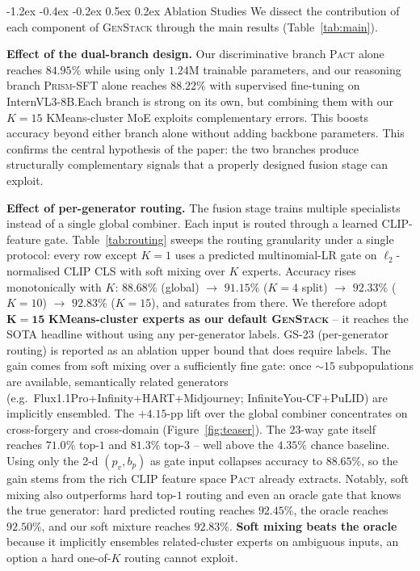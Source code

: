 \documentclass[10pt,twocolumn,letterpaper]{article}
\makeatletter
\renewcommand\subsection{\@startsection{subsection}{2}{\z@}%
  {-1.2ex \@plus -0.4ex \@minus -0.2ex}%
  {0.5ex \@plus 0.2ex}%
  {\normalfont\normalsize\bfseries}}
\newcommand{\vfive}{\textsc{Pact}}
\newcommand{\prism}{\textsc{Prism-SFT}}
\makeatother
\begin{document}
\subsection{Ablation Studies}
\label{sec:results}
We dissect the contribution of each component of \textsc{GenStack} through the main results (Table~\ref{tab:main}).

\textbf{Effect of the dual-branch design.}
Our discriminative branch \vfive{} alone reaches $84.95\%$ while using only $1.24$M trainable parameters, and our reasoning branch \prism{} alone reaches $88.22\%$ with supervised fine-tuning on InternVL3-8B.{Each branch is strong on its own, but combining them with our $K{=}15$ KMeans-cluster MoE exploits complementary errors. This boosts accuracy beyond either branch alone without adding backbone parameters.} This confirms the central hypothesis of the paper: the two branches produce structurally complementary signals that a properly designed fusion stage can exploit.

\textbf{Effect of per-generator routing.}
\label{sec:routing_ablation}
The fusion stage trains multiple specialists instead of a single global combiner. Each input is routed through a learned CLIP-feature gate. Table~\ref{tab:routing} sweeps the routing granularity under a single protocol: every row except $K{=}1$ uses a predicted multinomial-LR gate on $\ell_2$-normalised CLIP CLS with soft mixing over $K$ experts. Accuracy rises monotonically with $K$: $88.68\%$ (global) $\to$ $91.15\%$ ($K{=}4$ split) $\to$ $92.33\%$ ($K{=}10$) $\to$ $\mathbf{92.83\%}$ ($K{=}15$), and saturates from there. We therefore adopt $\mathbf{K{=}15}$ \textbf{KMeans-cluster experts as our default \textsc{GenStack}} -- it reaches the SOTA headline without using any per-generator labels. \textsc{GS-23} (per-generator routing) is reported as an ablation upper bound that does require labels. The gain comes from soft mixing over a sufficiently fine gate: once $\sim\!15$ subpopulations are available, semantically related generators (e.g.\ Flux1.1Pro+Infinity+HART+Midjourney; InfiniteYou-CF+PuLID) are implicitly ensembled. The $+4.15$-pp lift over the global combiner concentrates on cross-forgery and cross-domain (Figure~\ref{fig:teaser}). The $23$-way gate itself reaches $71.0\%$ top-$1$ and $81.3\%$ top-$3$ -- well above the $4.35\%$ chance baseline. Using only the 2-d $(p_v, b_p)$ as gate input collapses accuracy to $88.65\%$, so the gain stems from the rich CLIP feature space \vfive{} already extracts. Notably, soft mixing also outperforms hard top-$1$ routing and even an oracle gate that knows the true generator: hard predicted routing reaches $92.45\%$, the oracle reaches $92.50\%$, and our soft mixture reaches $\mathbf{92.83\%}$. \textbf{Soft mixing beats the oracle} because it implicitly ensembles related-cluster experts on ambiguous inputs, an option a hard one-of-$K$ routing cannot exploit.
\end{document}
